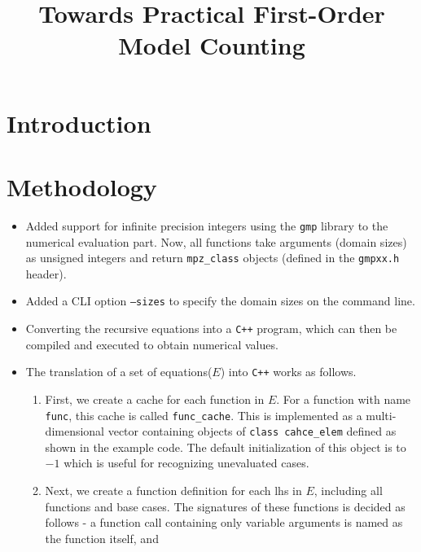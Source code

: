 \documentclass{article}
\title{Towards Practical First-Order Model Counting}
\begin{document}
\maketitle

\begin{abstract}
\end{abstract}

\section{Introduction}

\section{Methodology}

\begin{itemize}
  \item Added support for infinite precision integers using the \texttt{gmp}
        library to the numerical evaluation part. Now, all functions take
        arguments (domain sizes) as unsigned integers and return
        \texttt{mpz\_class} objects (defined in the \texttt{gmpxx.h} header).
  \item Added a CLI option \texttt{--sizes} to specify the domain sizes on the
        command line.
  \item Converting the recursive equations into a \texttt{C++} program, which
        can then be compiled and executed to obtain numerical values.
  \item The translation of a set of equations($E$) into \texttt{C++} works as
        follows.
        \begin{enumerate}
          \item First, we create a cache for each function in $E$. For a
                function with name \texttt{func}, this cache is called
                \texttt{func\_cache}. This is implemented as a multi-dimensional
                vector containing objects of \texttt{class cahce\_elem} defined
                as shown in the example code. The default initialization of this
                object is to $-1$ which is useful for recognizing unevaluated
                cases.
          \item Next, we create a function definition for each lhs in $E$,
                including all functions and base cases. The signatures of these
                functions is decided as follows - a function call containing
                only variable arguments is named as the function itself, and

\end{enumerate}
\end{itemize}
\end{document}
